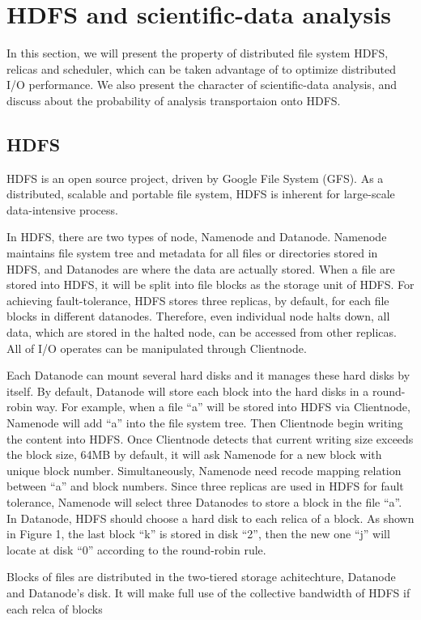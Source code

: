 \documentclass[preprint,12pt]{elsarticle}
\begin{document}
\section{HDFS and scientific-data analysis}
In this section, we will present the property of distributed file system HDFS, relicas and scheduler, which can be taken advantage
of to optimize distributed I/O performance. We also present the character of scientific-data analysis, and discuss about the 
probability of analysis transportaion onto HDFS.

\subsection{HDFS}
HDFS is an open source project, driven by Google File System (GFS). As a distributed, scalable and portable file system, HDFS is
inherent for large-scale data-intensive process. \par
In HDFS, there are two types of node, Namenode and Datanode. Namenode maintains file system tree and metadata for all files or
directories stored in HDFS, and Datanodes are where the data are actually stored. When a file are stored into HDFS, it will be
split into file blocks as the storage unit of HDFS. For achieving fault-tolerance, HDFS stores three replicas, by default, for each
file blocks in different datanodes. Therefore, even individual node halts down, all data, which are stored in the halted node, can
be accessed from other replicas. All of I/O operates can be manipulated through Clientnode. \par
Each Datanode can mount several hard disks and it manages these hard disks by itself. By default, Datanode will store each block
into the hard disks in a round-robin way. For example, when a file ``a'' will be stored into HDFS via Clientnode, Namenode will add
``a'' into the file system tree. Then Clientnode begin writing the content into HDFS. Once Clientnode detects that current writing
size exceeds the block size, 64MB by default, it will ask Namenode for a new block with unique block number. Simultaneously,
Namenode need recode mapping relation between ``a'' and block numbers. Since three replicas are used in HDFS for fault tolerance,
Namenode will select three Datanodes to store a block in the file ``a''. In Datanode, HDFS should choose a hard disk to each relica 
of a block. As shown in Figure 1, the last block ``k'' is stored in disk ``2'', then the new one ``j'' will locate at disk ``0'' 
according to the round-robin rule. \par
Blocks of files are distributed in the two-tiered storage achitechture, Datanode and Datanode's disk. It will make full use of the
collective bandwidth of HDFS if each relca of blocks  
\end{document}
